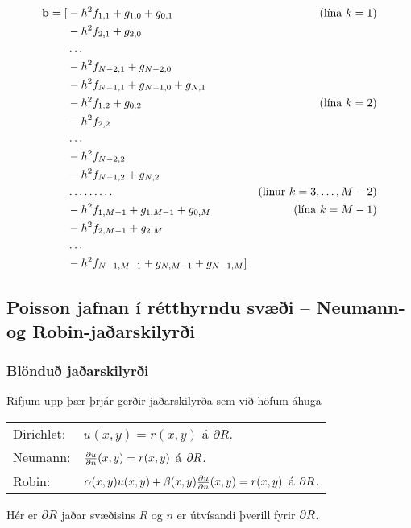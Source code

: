 \documentclass[icelandic,a4paper,12pt]{article}
\begin{document}
{}\vspace{-0.2in}
{\small \begin{align*}
  \mbox{${\bf b}$} = [ 
  &-h^2 f_{1,1} + g_{1,0} + g_{0,1} & (\text{lína } k=1)\\
  &-h^2 f_{2,1} + g_{2,0} \\
  &\ldots \\
  &-h^2 f_{N-2,1} + g_{N-2,0} \\
  &-h^2 f_{N-1,1} + g_{N-1,0} + g_{N,1} \\
  &-h^2 f_{1,2} + g_{0,2} & (\text{lína } k=2)\\
  &-h^2 f_{2,2} \\
  &\ldots \\
  &-h^2 f_{N-2,2}\\
  &-h^2 f_{N-1,2} + g_{N,2}\\
  & \ldots \ldots \ldots  & (\text{línur } k=3,\ldots,M-2)\\
  &-h^2 f_{1,M-1} + g_{1,M-1} + g_{0,M} & (\text{lína } k=M-1)\\
  &-h^2 f_{2,M-1} + g_{2,M} \\
  &\ldots \\
  &-h^2 f_{N-1,M-1} + g_{N,M-1} + g_{N-1,M} ]\\
  \end{align*}}


\subsection{Poisson jafnan í rétthyrndu svæði -- Neumann- og Robin-jaðarskilyrði}

\subsubsection{Blönduð jaðarskilyrði}
 Rifjum upp þær þrjár gerðir jaðarskilyrða sem við höfum áhuga
 \begin{center}
 \begin{tabular}{ll}
  Dirichlet: & $u(x,y) = r(x,y)$ á ${\partial} R$.\\
  Neumann:   & $\frac{{\partial} u}{{\partial} n}(x,y) = r(x,y)$ á ${\partial} R$.\\
  Robin:     & $\alpha(x,y)u(x,y) + 
  \beta(x,y)\frac{{\partial} u}{{\partial} n}(x,y) = r(x,y)$ á  ${\partial} R$.\\
 \end{tabular}
 \end{center}
Hér er ${\partial} R$ jaðar svæðisins $R$ og $n$ er útvísandi þverill fyrir ${\partial} R$.
\end{document}
